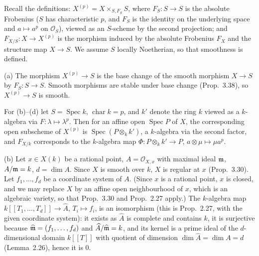 \documentclass[11pt]{article}
\begin{document}
\pf
Recall the definitions: $X^{(p)}=X\times_{S,F_S}S$, where $F_S:S\to S$ is the absolute Frobenius ($S$ has characteristic $p$, and $F_S$ is the identity on the underlying space and $a\mapsto a^p$ on $\mathcal O_S$), viewed as an $S$-scheme by the second projection; and $F_{X/S}:X\to X^{(p)}$ is the morphism induced by the absolute Frobenius $F_X$ and the structure map $X\to S$. We assume $S$ locally Noetherian, so that smoothness is defined.

(a) The morphism $X^{(p)}\to S$ is the base change of the smooth morphism $X\to S$ by $F_S:S\to S$. Smooth morphisms are stable under base change (Prop.~3.38), so $X^{(p)}\to S$ is smooth.

For (b)--(d) let $S=\operatorname{Spec}k$, $\operatorname{char}k=p$, and $k'$ denote the ring $k$ viewed as a $k$-algebra via $F:\lambda\mapsto\lambda^p$. Then for an affine open $\operatorname{Spec}P$ of $X$, the corresponding open subscheme of $X^{(p)}$ is $\operatorname{Spec}(P\otimes_kk')$, a $k$-algebra via the second factor, and $F_{X/k}$ corresponds to the $k$-algebra map $\Phi:P\otimes_kk'\to P$, $a\otimes\mu\mapsto\mu a^p$.

(b) Let $x\in X(k)$ be a rational point, $A=\mathcal O_{X,x}$ with maximal ideal $\mathfrak m$, $A/\mathfrak m=k$, $d=\dim A$. Since $X$ is smooth over $k$, $X$ is regular at $x$ (Prop.~3.30). Let $f_1,\dots,f_d$ be a coordinate system of $A$. (Since $x$ is a rational point, $x$ is closed, and we may replace $X$ by an affine open neighbourhood of $x$, which is an algebraic variety, so that Prop.~3.30 and Prop.~2.27 apply.) The $k$-algebra map $k[[T_1,\dots,T_d]]\to\widehat A$, $T_i\mapsto f_i$, is an isomorphism (this is Prop.~2.27, with the given coordinate system): it exists as $\widehat A$ is complete and contains $k$, it is surjective because $\widehat{\mathfrak m}=(f_1,\dots,f_d)$ and $\widehat A/\widehat{\mathfrak m}=k$, and its kernel is a prime ideal of the $d$-dimensional domain $k[[T]]$ with quotient of dimension $\dim\widehat A=\dim A=d$ (Lemma~2.26), hence it is $0$.
\end{document}
